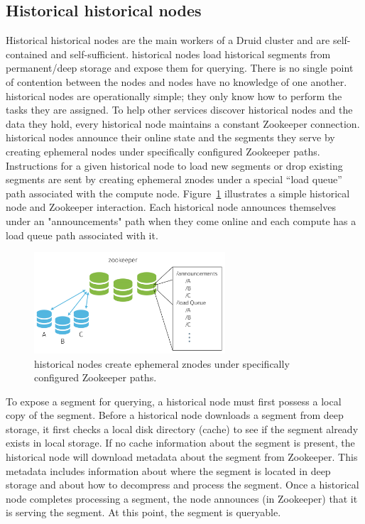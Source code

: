 \documentclass{vldb}
\begin{document}
\subsection{Historical historical nodes}
Historical historical nodes are the main workers of a Druid cluster and
are self-contained and self-sufficient. historical nodes load historical
segments from permanent/deep storage and expose them for
querying. There is no single point of contention between the nodes and
nodes have no knowledge of one another. historical nodes are
operationally simple; they only know how to perform the tasks they are
assigned. To help other services discover historical nodes and the data
they hold, every historical node maintains a constant Zookeeper
connection. historical nodes announce their online state and the segments
they serve by creating ephemeral nodes under specifically configured
Zookeeper paths. Instructions for a given historical node to load new
segments or drop existing segments are sent by creating ephemeral
znodes under a special “load queue” path associated with the compute
node. Figure~\ref{fig:zookeeper} illustrates a simple historical node and Zookeeper interaction.
Each historical node announces themselves under an "announcements" path when they come online
and each compute has a load queue path associated with it.

\begin{figure}
\centering
\includegraphics[width = 2.8in]{zookeeper}
\caption{historical nodes create ephemeral znodes under specifically configured Zookeeper paths.}
\label{fig:zookeeper}
\end{figure}

To expose a segment for querying, a historical node must first possess a
local copy of the segment. Before a historical node downloads a segment
from deep storage, it first checks a local disk directory (cache) to
see if the segment already exists in local storage. If no cache
information about the segment is present, the historical node will
download metadata about the segment from Zookeeper. This metadata
includes information about where the segment is located in deep
storage and about how to decompress and process the segment. Once a
historical node completes processing a segment, the node announces (in
Zookeeper) that it is serving the segment. At this point, the segment
is queryable.
\end{document}

